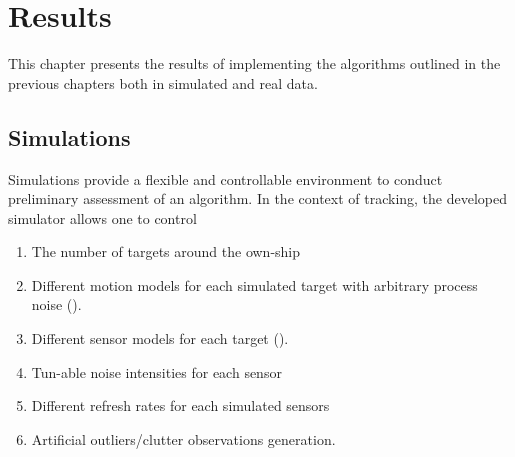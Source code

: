 \chapter{Results}\label{ch:Results}
This chapter presents the results of implementing the algorithms outlined in the previous chapters both in simulated and real data.

\section{Simulations}
Simulations provide a flexible and controllable environment to conduct preliminary assessment of an algorithm. In the context of tracking, the developed simulator allows one to control 
\begin{enumerate}[label=(\alph*)] 
	\item The number of targets around the own-ship
	\item Different motion models for each simulated target with arbitrary process noise ().
	\item Different sensor models for each target ().
	\item Tun-able noise intensities for each sensor
	\item Different refresh rates for each simulated sensors
	\item Artificial outliers/clutter observations generation.
\end{enumerate}